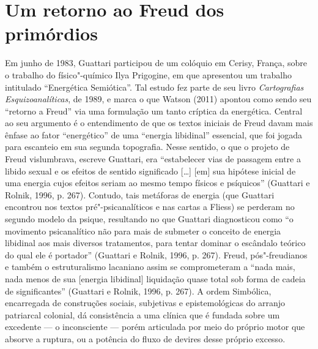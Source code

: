 \section{Um retorno ao Freud dos primórdios}

Em junho de 1983, Guattari participou de um colóquio em Cerisy, França,
sobre o trabalho do físico"-químico Ilya Prigogine, em que apresentou um
trabalho intitulado ``Energética Semiótica''. Tal estudo fez parte de
seu livro \emph{Cartografias Esquizoanalíticas}, de 1989, e marca o que
Watson (2011) apontou como sendo seu ``retorno a Freud'' via uma
formulação um tanto críptica da energética. Central ao seu argumento é o
entendimento de que os textos iniciais de Freud davam mais ênfase ao
fator ``energético'' de uma ``energia libidinal'' essencial, que foi
jogada para escanteio em sua segunda topografia. Nesse sentido, o que o
projeto de Freud vislumbrava, escreve Guattari, era ``estabelecer vias
de passagem entre a libido sexual e os efeitos de sentido significado
{[}\ldots{}{]} {[}em{]} sua hipótese inicial de uma energia cujos
efeitos seriam ao mesmo tempo físicos e psíquicos'' (Guattari e Rolnik,
1996, p. 267). Contudo, tais metáforas de energia (que Guattari
encontrou nos textos pré"-psicanalíticos e nas cartas a Fliess) se
perderam no segundo modelo da psique, resultando no que Guattari
diagnosticou como ``o movimento psicanalítico não para mais de submeter
o conceito de energia libidinal aos mais diversos tratamentos, para
tentar dominar o escândalo teórico do qual ele é portador'' (Guattari e
Rolnik, 1996, p. 267). Freud, pós"-freudianos e também o estruturalismo
lacaniano assim se comprometeram a ``nada mais, nada menos de sua
{[}energia libidinal{]} liquidação quase total sob forma de cadeia de
significantes'' (Guattari e Rolnik, 1996, p. 267). A ordem Simbólica,
encarregada de construções sociais, subjetivas e epistemológicas do
arranjo patriarcal colonial, dá consistência a uma clínica que é fundada
sobre um excedente --- o inconsciente --- porém articulada por meio do
próprio motor que absorve a ruptura, ou a potência do fluxo de devires
desse próprio excesso.

